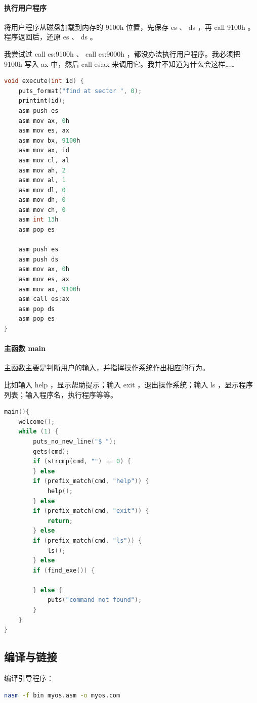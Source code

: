 \documentclass{article}
\begin{document}
\paragraph{执行用户程序}

将用户程序从磁盘加载到内存的 9100h 位置，先保存 es 、 ds ，再 call 9100h 。程序返回后，还原 es 、 ds 。

我尝试过 call es:9100h 、 call es:9000h ，都没办法执行用户程序。我必须把 9100h 写入 ax 中，然后 call es:ax 来调用它。我并不知道为什么会这样……

\begin{lstlisting}[language=C]
void execute(int id) {
	puts_format("find at sector ", 0);
	printint(id);
	asm push es
	asm mov ax, 0h
	asm mov es, ax
	asm mov bx, 9100h
	asm mov ax, id
	asm mov cl, al
	asm mov ah, 2
	asm mov al, 1
	asm mov dl, 0
	asm mov dh, 0
	asm mov ch, 0
	asm int 13h
	asm pop es
	
	asm push es
	asm push ds
	asm mov ax, 0h
	asm mov es, ax
	asm mov ax, 9100h
	asm call es:ax
	asm pop ds
	asm pop es
}
\end{lstlisting}

\paragraph{主函数 main}

主函数主要是判断用户的输入，并指挥操作系统作出相应的行为。

比如输入 help ，显示帮助提示；输入 exit ，退出操作系统；输入 ls ，显示程序列表；输入程序名，执行程序等等。

\begin{lstlisting}[language=C]
main(){
	welcome();
	while (1) {
		puts_no_new_line("$ ");
		gets(cmd);
		if (strcmp(cmd, "") == 0) {
		} else
		if (prefix_match(cmd, "help")) {
			help();
		} else
		if (prefix_match(cmd, "exit")) {
			return;
		} else
		if (prefix_match(cmd, "ls")) {
			ls();
		} else
		if (find_exe()) {
			
		} else {
			puts("command not found");
		}
	}
}
\end{lstlisting}

\subsection{编译与链接}

编译引导程序：

\begin{lstlisting}[language=bash]
nasm -f bin myos.asm -o myos.com
\end{lstlisting}
\end{document}
